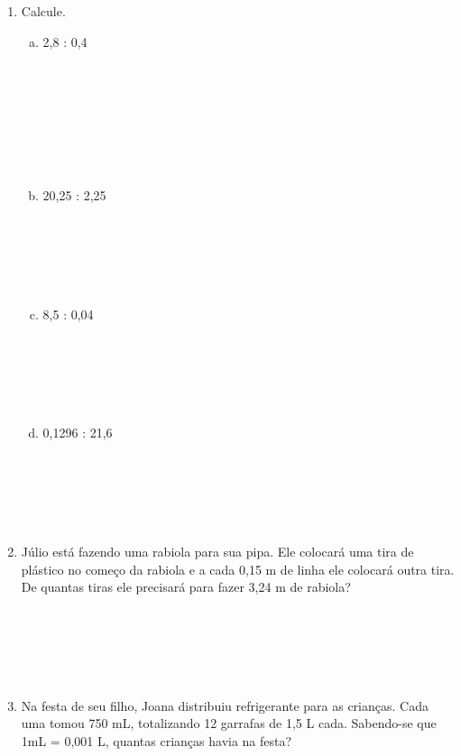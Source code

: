 \documentclass[a4paper,14pt]{article}
\begin{document}
\begin{multicols}{2}
    	\begin{enumerate}
   			\item Calcule.
   			\begin{enumerate}[a)]
   				\item 2,8 : 0,4  \\\\\\\\\\\\\\\\
   				\item 20,25 : 2,25 \\\\\\\\\\\\
   				\item 8,5 : 0,04 \\\\\\\\\\\\
   				\item 0,1296 : 21,6 \\\\\\\\\\\\
   			\end{enumerate}
   			\item Júlio está fazendo uma rabiola para sua pipa. Ele colocará uma tira de plástico no começo da rabiola e a cada 0,15 m de linha ele colocará outra tira. De quantas tiras ele precisará para fazer 3,24 m de rabiola? \\\\\\\\\\\\
   			\item Na festa de seu filho, Joana distribuiu refrigerante para as crianças. Cada uma tomou 750 mL, totalizando 12 garrafas de 1,5 L cada. Sabendo-se que 1mL = 0,001 L, quantas crianças havia na festa? \\\\\\\\\\\\\\\\\\\\

\end{enumerate}
\end{multicols}
\end{document}

